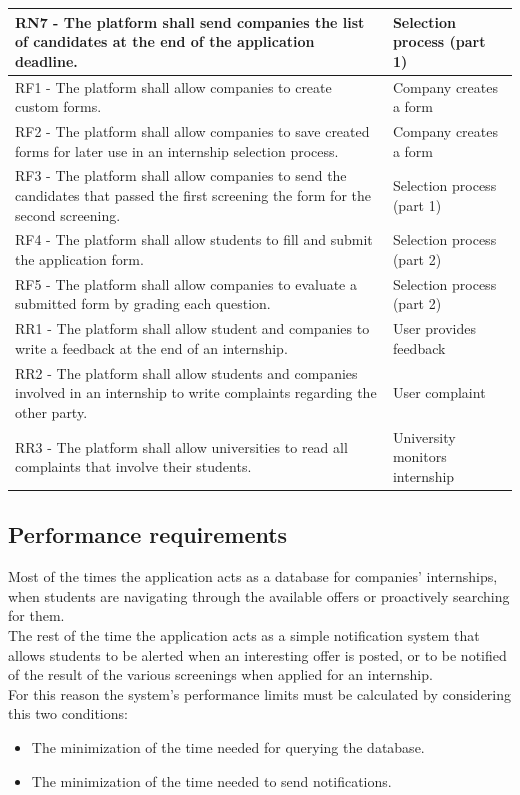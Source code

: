 \documentclass[11pt,twoside]{article}
\begin{document}
\begin{table}[H]
\begin{tabular}{| >{\arraybackslash}m{} | >{\centering\arraybackslash}m{} |}
\hline
RN7 - The platform shall send companies the list of candidates at the end of the application deadline. & Selection process (part 1) \\
\hline
RF1 - The platform shall allow companies to create custom forms. & Company creates a form \\
\hline
RF2 - The platform shall allow companies to save created forms for later use in an internship selection process. & Company creates a form \\
\hline
RF3 - The platform shall allow companies to send the candidates that passed the first screening the form for the second screening. & Selection process (part 1) \\
\hline
RF4 - The platform shall allow students to fill and submit the application form. & Selection process (part 2) \\
\hline
RF5 - The platform shall allow companies to evaluate a submitted form by grading each question. & Selection process (part 2) \\
\hline
RR1 - The platform shall allow student and companies to write a feedback at the end of an internship. & User provides feedback \\
\hline
RR2 - The platform shall allow students and companies involved in an internship to write complaints regarding the other party. & User complaint \\
\hline
RR3 - The platform shall allow universities to read all complaints that involve their students. & University monitors internship \\
\hline
\end{tabular}
\end{table}

\newpage

	\subsection{Performance requirements}
Most of the times the application acts as a database for companies' internships, when students are navigating through the available offers or proactively searching for them. \\
The rest of the time the application acts as a simple notification system that allows students to be alerted when an interesting offer is posted, or to be notified of the result of the various screenings when applied for an internship. \\
For this reason the system's performance limits must be calculated by considering this two conditions: 
\begin{itemize}
\item The minimization of the time needed for querying the database.
\item The minimization of the time needed to send notifications.
\end{itemize}
	
\end{document}

